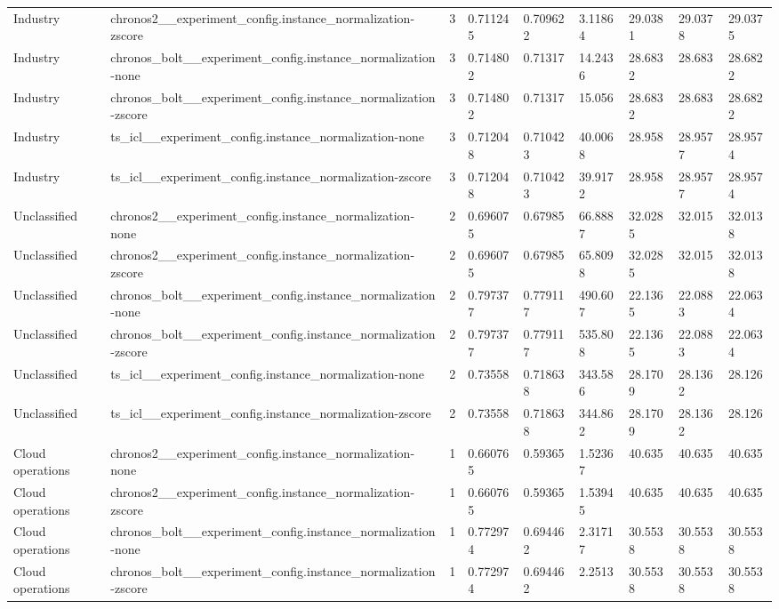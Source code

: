 \begin{tabular}{lllllllll}
Industry & chronos2\_\_experiment\_config.instance\_normalization-zscore & 3 & 0.711245 & 0.709622 & 3.11864 & 29.0381 & 29.0378 & 29.0375 \\
Industry & chronos\_bolt\_\_experiment\_config.instance\_normalization-none & 3 & 0.714802 & 0.71317 & 14.2436 & 28.6832 & 28.683 & 28.6822 \\
Industry & chronos\_bolt\_\_experiment\_config.instance\_normalization-zscore & 3 & 0.714802 & 0.71317 & 15.056 & 28.6832 & 28.683 & 28.6822 \\
Industry & ts\_icl\_\_experiment\_config.instance\_normalization-none & 3 & 0.712048 & 0.710423 & 40.0068 & 28.958 & 28.9577 & 28.9574 \\
Industry & ts\_icl\_\_experiment\_config.instance\_normalization-zscore & 3 & 0.712048 & 0.710423 & 39.9172 & 28.958 & 28.9577 & 28.9574 \\
Unclassified & chronos2\_\_experiment\_config.instance\_normalization-none & 2 & 0.696075 & 0.67985 & 66.8887 & 32.0285 & 32.015 & 32.0138 \\
Unclassified & chronos2\_\_experiment\_config.instance\_normalization-zscore & 2 & 0.696075 & 0.67985 & 65.8098 & 32.0285 & 32.015 & 32.0138 \\
Unclassified & chronos\_bolt\_\_experiment\_config.instance\_normalization-none & 2 & 0.797377 & 0.779117 & 490.607 & 22.1365 & 22.0883 & 22.0634 \\
Unclassified & chronos\_bolt\_\_experiment\_config.instance\_normalization-zscore & 2 & 0.797377 & 0.779117 & 535.808 & 22.1365 & 22.0883 & 22.0634 \\
Unclassified & ts\_icl\_\_experiment\_config.instance\_normalization-none & 2 & 0.73558 & 0.718638 & 343.586 & 28.1709 & 28.1362 & 28.126 \\
Unclassified & ts\_icl\_\_experiment\_config.instance\_normalization-zscore & 2 & 0.73558 & 0.718638 & 344.862 & 28.1709 & 28.1362 & 28.126 \\
Cloud operations & chronos2\_\_experiment\_config.instance\_normalization-none & 1 & 0.660765 & 0.59365 & 1.52367 & 40.635 & 40.635 & 40.635 \\
Cloud operations & chronos2\_\_experiment\_config.instance\_normalization-zscore & 1 & 0.660765 & 0.59365 & 1.53945 & 40.635 & 40.635 & 40.635 \\
Cloud operations & chronos\_bolt\_\_experiment\_config.instance\_normalization-none & 1 & 0.772974 & 0.694462 & 2.31717 & 30.5538 & 30.5538 & 30.5538 \\
Cloud operations & chronos\_bolt\_\_experiment\_config.instance\_normalization-zscore & 1 & 0.772974 & 0.694462 & 2.2513 & 30.5538 & 30.5538 & 30.5538 \\

\end{tabular}
